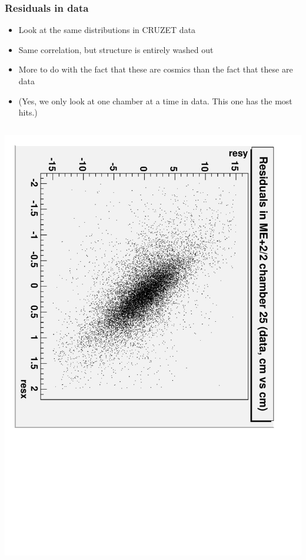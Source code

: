\documentclass[compress]{beamer}
\begin{document}
\begin{frame}
\frametitle{Residuals in data}
\scriptsize
\begin{itemize}
\item Look at the same distributions in CRUZET data
\item Same correlation, but structure is entirely washed out
\item More to do with the fact that these are cosmics than the fact that these are data
\item (Yes, we only look at one chamber at a time in data.  This one has the most hits.)
\end{itemize}

\vfill
\begin{columns}
\includegraphics[height=\linewidth, angle=90]{data_residuals_ME22.pdf}

\end{columns}
\end{frame}
\end{document}
